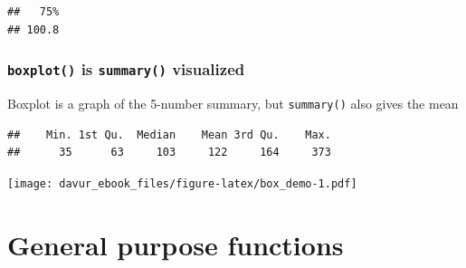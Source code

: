 \documentclass[]{book}
\newenvironment{Shaded}{\begin{snugshade}}{\end{snugshade}}
\newcommand{\CommentTok}[1]{\textcolor[rgb]{0.56,0.35,0.01}{\textit{#1}}}
\newcommand{\DataTypeTok}[1]{\textcolor[rgb]{0.13,0.29,0.53}{#1}}
\newcommand{\FloatTok}[1]{\textcolor[rgb]{0.00,0.00,0.81}{#1}}
\newcommand{\KeywordTok}[1]{\textcolor[rgb]{0.13,0.29,0.53}{\textbf{#1}}}
\newcommand{\NormalTok}[1]{#1}
\newcommand{\OperatorTok}[1]{\textcolor[rgb]{0.81,0.36,0.00}{\textbf{#1}}}
\begin{document}
\begin{Shaded}
\end{Shaded}

\begin{verbatim}
##   75% 
## 100.8
\end{verbatim}

\hypertarget{boxplot-is-summary-visualized}{%
\subsubsection*{\texorpdfstring{\texttt{boxplot()} is \texttt{summary()} visualized}{boxplot() is summary() visualized}}\label{boxplot-is-summary-visualized}}

Boxplot is a graph of the 5-number summary, but \texttt{summary()} also gives the mean

\begin{Shaded}
\end{Shaded}

\begin{verbatim}
##    Min. 1st Qu.  Median    Mean 3rd Qu.    Max. 
##      35      63     103     122     164     373
\end{verbatim}

\begin{Shaded}
\end{Shaded}

\texttt{[image: davur\_ebook\_files/figure-latex/box\_demo-1.pdf]}

\hypertarget{general-purpose-functions}{%
\section{General purpose functions}\label{general-purpose-functions}}
\end{document}
